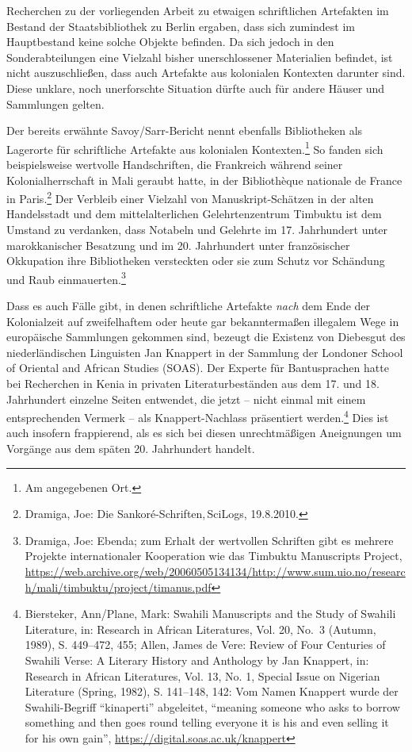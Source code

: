 \documentclass[a4paper,
fontsize=11pt,
oneside,
numbers=noperiodatend,
parskip=half-,
bibliography=totoc,
final
]{scrartcl}
\begin{document}
Recherchen zu der vorliegenden Arbeit zu etwaigen schriftlichen
Artefakten im Bestand der Staatsbibliothek zu Berlin ergaben, dass sich
zumindest im Hauptbestand keine solche Objekte befinden. Da sich jedoch
in den Sonderabteilungen eine Vielzahl bisher unerschlossener
Materialien befindet, ist nicht auszuschließen, dass auch Artefakte aus
kolonialen Kontexten darunter sind. Diese unklare, noch unerforschte
Situation dürfte auch für andere Häuser und Sammlungen gelten.

Der bereits erwähnte Savoy/Sarr-Bericht nennt ebenfalls Bibliotheken als
Lagerorte für schriftliche Artefakte aus kolonialen
Kontexten.\footnote{Am angegebenen Ort.} So fanden sich beispielsweise
wertvolle Handschriften, die Frankreich während seiner
Kolonialherrschaft in Mali geraubt hatte, in der Bibliothèque nationale
de France in Paris.\footnote{Dramiga, Joe: Die
  Sankoré-Schriften,\,SciLogs, 19.8.2010.} Der Verbleib einer Vielzahl
von Manuskript-Schätzen in der alten Handelsstadt und dem
mittelalterlichen Gelehrtenzentrum Timbuktu ist dem Umstand zu
verdanken, dass Notabeln und Gelehrte im 17. Jahrhundert unter
marokkanischer Besatzung und im 20. Jahrhundert unter französischer
Okkupation ihre Bibliotheken versteckten oder sie zum Schutz vor
Schändung und Raub einmauerten.\footnote{Dramiga, Joe: Ebenda; zum
  Erhalt der wertvollen Schriften gibt es mehrere Projekte
  internationaler Kooperation wie das Timbuktu Manuscripts Project,
  \url{https://web.archive.org/web/20060505134134/http://www.sum.uio.no/research/mali/timbuktu/project/timanus.pdf}}

Dass es auch Fälle gibt, in denen schriftliche Artefakte \emph{nach} dem
Ende der Kolonialzeit auf zweifelhaftem oder heute gar bekanntermaßen
illegalem Wege in europäische Sammlungen gekommen sind, bezeugt die
Existenz von Diebesgut des niederländischen Linguisten Jan Knappert in
der Sammlung der Londoner School of Oriental and African Studies (SOAS).
Der Experte für Bantusprachen hatte bei Recherchen in Kenia in privaten
Literaturbeständen aus dem 17. und 18. Jahrhundert einzelne Seiten
entwendet, die jetzt -- nicht einmal mit einem entsprechenden Vermerk --
als Knappert-Nachlass präsentiert werden.\footnote{Biersteker,
  Ann/Plane, Mark: Swahili Manuscripts and the Study of Swahili
  Literature, in: Research in African Literatures, Vol. 20, No.~3
  (Autumn, 1989), S. 449--472, 455; Allen, James de Vere: Review of Four
  Centuries of Swahili Verse: A Literary History and Anthology by Jan
  Knappert, in: Research in African Literatures, Vol. 13, No. 1, Special
  Issue on Nigerian Literature (Spring, 1982), S. 141--148, 142: Vom
  Namen Knappert wurde der Swahili-Begriff \enquote{kinaperti}
  abgeleitet, \enquote{meaning someone who asks to borrow something and
  then goes round telling everyone it is his and even selling it for his
  own gain}, \url{https://digital.soas.ac.uk/knappert}} Dies ist auch
insofern frappierend, als es sich bei diesen unrechtmäßigen Aneignungen
um Vorgänge aus dem späten 20. Jahrhundert handelt.
\end{document}
